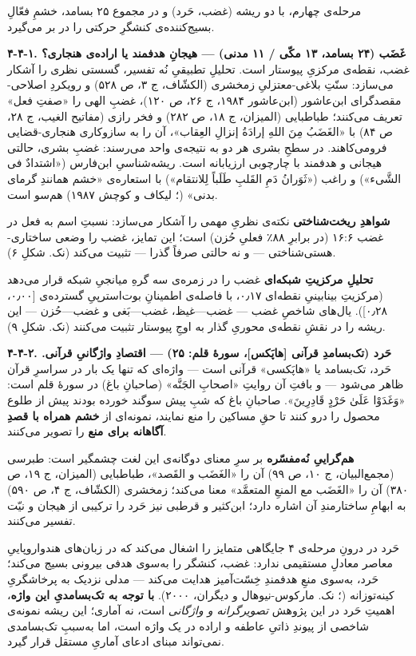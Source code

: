 \begin{RTL}
\begin{otherlanguage}{persian}
مرحله‌ی چهارم، با دو ریشه (غضب، حَرد) و در مجموع ۲۵ بسامد، خشمِ فعّالِ
بسیج‌کننده‌ی کنشگرِ حرکتی را در بر می‌گیرد.

\textbf{۴-۴-۱. غَضَب (۲۴ بسامد، ۱۳ مکّی / ۱۱ مدنی) --- هیجانِ هدفمند یا
اراده‌ی هنجاری؟} غضب، نقطه‌ی مرکزیِ پیوستار است. تحلیلِ تطبیقیِ نُه تفسیر،
گسستی نظری را آشکار می‌سازد: سنّتِ بلاغی-معتزلیِ زمخشری (الکشّاف، ج ۳، ص ۵۲۸)
و رویکردِ اصلاحی-مقصدگرای ابن‌عاشور (ابن‌عاشور ۱۹۸۴، ج ۲۶، ص ۱۲۰)، غضبِ الهی
را «صفتِ فعل» تعریف می‌کنند؛ طباطبایی (المیزان، ج ۱۸، ص ۲۸۲) و فخر رازی
(مفاتیح الغیب، ج ۲۸، ص ۸۴) با «الغَضَبُ مِنَ اللهِ إرادَةُ إنزالِ العِقاب»، آن را
به سازوکاری هنجاری-قضایی فرومی‌کاهند. در سطحِ بشری هر دو به نتیجه‌ی واحد
می‌رسند: غضبِ بشری، حالتی هیجانی و هدفمند با چارچوبی ارزیابانه است.
ریشه‌شناسیِ ابن‌فارس («اشتدادٌ فی الشَّیء») و راغب («ثَوَرانُ دَمِ القَلبِ طَلَباً
لِلانتقام») با استعاره‌ی «خشم همانندِ گرمای بدنی»
(؛ لیکاف و کوچش ۱۹۸۷) هم‌سو است.

\textbf{شواهدِ ریخت‌شناختی} نکته‌ی نظریِ مهمی را آشکار می‌سازد: نسبتِ اسم به
فعل در غضب ۱۶:۶ (در برابرِ ۸۸٪ فعلیِ حُزن) است؛ این تمایز، غضب را وضعی
ساختاری-هستی‌شناختی --- و نه حالتی صرفاً گذرا --- تثبیت می‌کند (نک. شکلِ ۶).

\textbf{تحلیلِ مرکزیتِ شبکه‌ای} غضب را در زمره‌ی سه گرهِ میانجیِ شبکه قرار
می‌دهد (مرکزیتِ بینابینیِ نقطه‌ای ۰٫۱۷، با فاصله‌ی اطمینانِ بوت‌استرپیِ گسترده‌ی
{[}۰٫۰۰، ۰٫۲۸{]}). یال‌های شاخصِ غضب --- غضب---غیظ، غضب---بَغی و غضب---حُزن
--- این ریشه را در نقشِ نقطه‌ی محوریِ گذار به اوجِ پیوستار تثبیت می‌کنند (نک.
شکلِ ۹).

\textbf{۴-۴-۲. حَرد (تک‌بسامدِ قرآنی {[}هاپَکس{]}، سورۀ قلم: ۲۵) --- اقتصادِ
واژگانیِ قرآنی.} حَرد، تک‌بسامد یا «هاپَکسی» قرآنی است --- واژه‌ای که تنها یک
بار در سراسرِ قرآن ظاهر می‌شود --- و بافتِ آن روایتِ «اصحابِ الجَنَّه» (صاحبانِ
باغ) در سورۀ قلم است: «وَغَدَوْا عَلَىٰ حَرْدٍ قَادِرِينَ». صاحبانِ باغ که شبِ پیش سوگند
خورده بودند پیش از طلوع محصول را درو کنند تا حقِ مساکین را منع نمایند،
نمونه‌ای از \textbf{خشم همراه با قصدِ آگاهانه برای منع} را تصویر می‌کنند.

\textbf{هم‌گراییِ نُه‌مفسّره} بر سرِ معنای دوگانه‌ی این لغت چشمگیر است: طبرسی
(مجمع‌البیان، ج ۱۰، ص ۹۹) آن را «الغَضَب و القَصد»، طباطبایی (المیزان، ج ۱۹،
ص ۳۸۰) آن را «الغَضَب مع المنعِ المتعمَّد» معنا می‌کند؛ زمخشری (الکشّاف، ج ۴، ص
۵۹۰) به ابهامِ ساختارمندِ آن اشاره دارد؛ ابن‌کثیر و قرطبی نیز حَرد را ترکیبی
از هیجان و نیّت تفسیر می‌کنند.

حَرد در درونِ مرحله‌ی ۴ جایگاهی متمایز را اشغال می‌کند که در زبان‌های
هندواروپاییِ معاصر معادلِ مستقیمی ندارد: غضب، کنشگر را به‌سوی هدفی بیرونی
بسیج می‌کند؛ حَرد، به‌سوی منعِ هدفمندِ خِسّت‌آمیز هدایت می‌کند --- مدلی نزدیک به
پرخاشگریِ کینه‌توزانه (؛ نک. مارکوس-نیوهال و
دیگران، ۲۰۰۰). \textbf{با توجه به تک‌بسامدیِ این واژه}، اهمیتِ حَرد در این
پژوهش \emph{تصویرگرانه و واژگانی} است، نه آماری؛ این ریشه نمونه‌ی شاخصی
از پیوندِ ذاتیِ عاطفه و اراده در یک واژه است، اما به‌سببِ تک‌بسامدی نمی‌تواند
مبنای ادعای آماریِ مستقل قرار گیرد.


\end{otherlanguage}
\end{RTL}
